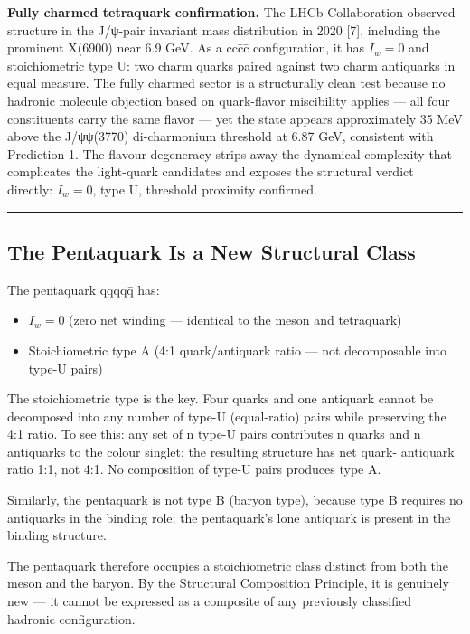 \documentclass[12pt,a4paper]{article}
\begin{document}
\textbf{Fully charmed tetraquark confirmation.} The LHCb Collaboration
observed structure in the J/ψ-pair invariant mass distribution in 2020
{[}7{]}, including the prominent X(6900) near 6.9 GeV. As a ccc̄c̄
configuration, it has \(I_w = 0\) and stoichiometric type U: two charm
quarks paired against two charm antiquarks in equal measure. The fully
charmed sector is a structurally clean test because no hadronic molecule
objection based on quark-flavor miscibility applies --- all four
constituents carry the same flavor --- yet the state appears
approximately 35 MeV above the J/ψψ(3770) di-charmonium threshold at
6.87 GeV, consistent with Prediction 1. The flavour degeneracy strips
away the dynamical complexity that complicates the light-quark
candidates and exposes the structural verdict directly: \(I_w = 0\),
type U, threshold proximity confirmed.

\begin{center}\rule{0.5\linewidth}{0.5pt}\end{center}

\hypertarget{the-pentaquark-is-a-new-structural-class}{%
\subsection{The Pentaquark Is a New Structural
Class}\label{the-pentaquark-is-a-new-structural-class}}

The pentaquark qqqqq̄ has:

\begin{itemize}
\tightlist
\item
  \(I_w = 0\) (zero net winding --- identical to the meson and
  tetraquark)
\item
  Stoichiometric type A (4:1 quark/antiquark ratio --- not decomposable
  into type-U pairs)
\end{itemize}

The stoichiometric type is the key. Four quarks and one antiquark cannot
be decomposed into any number of type-U (equal-ratio) pairs while
preserving the 4:1 ratio. To see this: any set of n type-U pairs
contributes n quarks and n antiquarks to the colour singlet; the
resulting structure has net quark- antiquark ratio 1:1, not 4:1. No
composition of type-U pairs produces type A.

Similarly, the pentaquark is not type B (baryon type), because type B
requires no antiquarks in the binding role; the pentaquark's lone
antiquark is present in the binding structure.

The pentaquark therefore occupies a stoichiometric class distinct from
both the meson and the baryon. By the Structural Composition Principle,
it is genuinely new --- it cannot be expressed as a composite of any
previously classified hadronic configuration.
\end{document}
